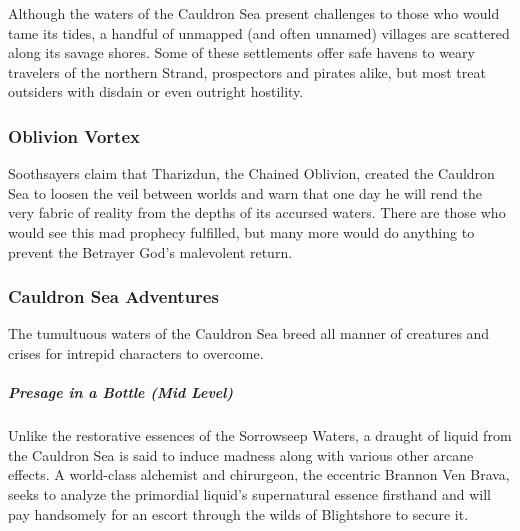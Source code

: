 \documentclass[10pt,a4paper,twoside,bg=print,twocolumn,openany,nodeprecatedcode]{dndbook}
\begin{document}
Although the waters of the Cauldron Sea present challenges to those who would tame its tides, a handful of unmapped (and often unnamed) villages are scattered along its savage shores. Some of these settlements offer safe havens to weary travelers of the northern Strand, prospectors and pirates alike, but most treat outsiders with disdain or even outright hostility.

\subsubsection{Oblivion Vortex}
Soothsayers claim that Tharizdun, the Chained Oblivion, created the Cauldron Sea to loosen the veil between worlds and warn that one day he will rend the very fabric of reality from the depths of its accursed waters. There are those who would see this mad prophecy fulfilled, but many more would do anything to prevent the Betrayer God's malevolent return.

\subsubsection{Cauldron Sea Adventures}
The tumultuous waters of the Cauldron Sea breed all manner of creatures and crises for intrepid characters to overcome.

\subparagraph{Presage in a Bottle (Mid Level)}
Unlike the restorative essences of the Sorrowseep Waters, a draught of liquid from the Cauldron Sea is said to induce madness along with various other arcane effects. A world-class alchemist and chirurgeon, the eccentric Brannon Ven Brava, seeks to analyze the primordial liquid's supernatural essence firsthand and will pay handsomely for an escort through the wilds of Blightshore to secure it.
\end{document}
